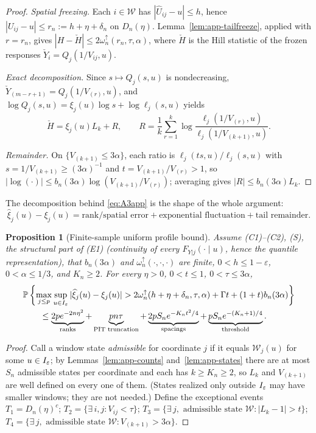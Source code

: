 \documentclass[bj,authoryear]{imsart}
\theoremstyle{plain}
\newtheorem{proposition}[theorem]{Proposition}
\begin{document}
\begin{appendix}
\begin{proof}
\emph{Spatial freezing.}  Each $i\in\mathcal W$ has
$|\widehat U_{ij}-u|\le h$, hence $|U_{ij}-u|\le r_n:=h+\eta+\delta_n$ on
$D_n(\eta)$.  Lemma~\ref{lem:app-tailfreeze}, applied with $r=r_n$, gives
$|H-\check H|\le2\omega_n^{\uparrow}(r_n,\tau,\alpha)$, where $\check H$
is the Hill statistic of the frozen responses
$\check Y_i=Q_j(1/V_{ij},u)$.

\emph{Exact decomposition.}  Since $s\mapsto Q_j(s,u)$ is nondecreasing,
$\check Y_{(m-r+1)}=Q_j(1/V_{(r)},u)$, and
$\log Q_j(s,u)=\xi_j(u)\log s+\log\ell_j(s,u)$ yields
\[
 \check H=\xi_j(u)L_k+R,
 \qquad
 R=\frac1k\sum_{r=1}^k
 \log\frac{\ell_j(1/V_{(r)},u)}{\ell_j(1/V_{(k+1)},u)}.
\]

\emph{Remainder.}  On $\{V_{(k+1)}\le3\alpha\}$, each ratio is
$\ell_j(ts,u)/\ell_j(s,u)$ with $s=1/V_{(k+1)}\ge(3\alpha)^{-1}$ and
$t=V_{(k+1)}/V_{(r)}>1$, so
$|\log(\cdot)|\le b_n(3\alpha)\log(V_{(k+1)}/V_{(r)})$; averaging gives
$|R|\le b_n(3\alpha)L_k$.
\end{proof}

The decomposition behind \eqref{eq:A3app} is the shape of the whole
argument:
\[
 \widehat\xi_j(u)-\xi_j(u)
 =\text{rank/spatial error}
 +\text{exponential fluctuation}
 +\text{tail remainder}.
\]

\begin{proposition}[Finite-sample uniform profile bound]
\label{thm:app-rank-profile}
Assume (C1)--(C2), (S), the structural part of (E1) (continuity of
every $F_{Y|j}(\cdot\mid u)$, hence the quantile representation), that
$b_n(3\alpha)$ and $\omega_n^{\uparrow}(\cdot,\cdot,\cdot)$ are finite,
$0<h\le1-\varepsilon$, $0<\alpha\le1/3$, and $K_n\ge2$.  For every
$\eta>0$, $0<t\le1$, $0<\tau\le3\alpha$,
\begin{align}
&\mathbb P\left\{\max_{j\le p}\sup_{u\in I_\varepsilon}
 |\widehat\xi_j(u)-\xi_j(u)|
 >2\omega_n^{\uparrow}(h+\eta+\delta_n,\tau,\alpha)
 +\Gamma t+(1+t)b_n(3\alpha)\right\}
 \nonumber\\
&\qquad\le
 \underbrace{2pe^{-2n\eta^2}}_{\text{ranks}}
 +\underbrace{pn\tau}_{\text{PIT truncation}}
 +\underbrace{2pS_ne^{-K_nt^2/4}}_{\text{spacings}}
 +\underbrace{pS_ne^{-(K_n+1)/4}}_{\text{threshold}}.
 \label{eq:A4app}
\end{align}
\end{proposition}

\begin{proof}
Call a window state \emph{admissible} for coordinate $j$ if it equals
$\mathcal W_j(u)$ for some $u\in I_\varepsilon$; by
Lemmas~\ref{lem:app-counts} and~\ref{lem:app-states} there are at most
$S_n$ admissible states per coordinate and each has
$k\ge K_n\ge2$, so $L_k$ and $V_{(k+1)}$ are well defined on every one of
them.  (States realized only outside $I_\varepsilon$ may have smaller windows; they
are not needed.)  Define the exceptional events
$T_1=D_n(\eta)^c$;
$T_2=\{\exists\,i,j:V_{ij}<\tau\}$;
$T_3=\{\exists\,j,\text{ admissible state }\mathcal W:|L_k-1|>t\}$;
$T_4=\{\exists\,j,\text{ admissible state }\mathcal W:
V_{(k+1)}>3\alpha\}$.


\end{proof}
\end{appendix}
\end{document}
